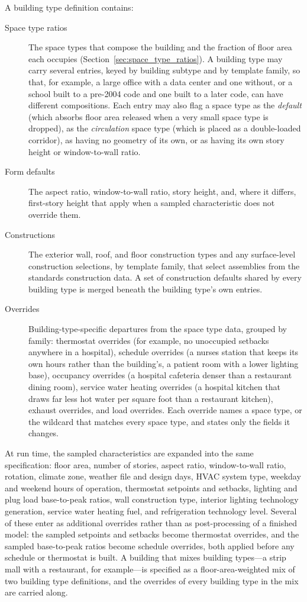 A building type definition contains:
\begin{description}
\item[Space type ratios] The space types that compose the building and the fraction of floor area each occupies (Section~\ref{sec:space_type_ratios}). A building type may carry several entries, keyed by building subtype and by template family, so that, for example, a large office with a data center and one without, or a school built to a pre-2004 code and one built to a later code, can have different compositions. Each entry may also flag a space type as the \emph{default} (which absorbs floor area released when a very small space type is dropped), as the \emph{circulation} space type (which is placed as a double-loaded corridor), as having no geometry of its own, or as having its own story height or window-to-wall ratio.
\item[Form defaults] The aspect ratio, window-to-wall ratio, story height, and, where it differs, first-story height that apply when a sampled characteristic does not override them.
\item[Constructions] The exterior wall, roof, and floor construction types and any surface-level construction selections, by template family, that select assemblies from the standards construction data. A set of construction defaults shared by every building type is merged beneath the building type's own entries.
\item[Overrides] Building-type-specific departures from the space type data, grouped by family: thermostat overrides (for example, no unoccupied setbacks anywhere in a hospital), schedule overrides (a nurses station that keeps its own hours rather than the building's, a patient room with a lower lighting base), occupancy overrides (a hospital cafeteria denser than a restaurant dining room), service water heating overrides (a hospital kitchen that draws far less hot water per square foot than a restaurant kitchen), exhaust overrides, and load overrides. Each override names a space type, or the wildcard that matches every space type, and states only the fields it changes.
\end{description}

At run time, the sampled characteristics are expanded into the same specification: floor area, number of stories, aspect ratio, window-to-wall ratio, rotation, climate zone, weather file and design days, HVAC system type, weekday and weekend hours of operation, thermostat setpoints and setbacks, lighting and plug load base-to-peak ratios, wall construction type, interior lighting technology generation, service water heating fuel, and refrigeration technology level. Several of these enter as additional overrides rather than as post-processing of a finished model: the sampled setpoints and setbacks become thermostat overrides, and the sampled base-to-peak ratios become schedule overrides, both applied before any schedule or thermostat is built. A building that mixes building types---a strip mall with a restaurant, for example---is specified as a floor-area-weighted mix of two building type definitions, and the overrides of every building type in the mix are carried along.

